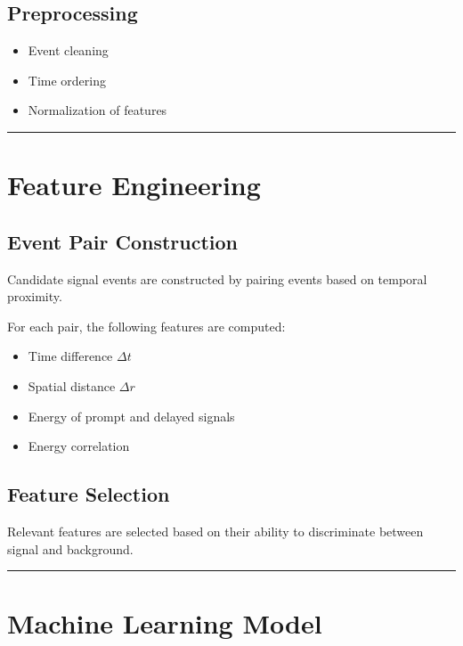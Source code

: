 \documentclass[
  authoryear,
  preprint]{elsarticle}
\providecommand{\tightlist}{%
  \setlength{\itemsep}{0pt}\setlength{\parskip}{0pt}}
\begin{document}
\subsection{Preprocessing}\label{preprocessing}

\begin{itemize}
\tightlist
\item
  Event cleaning
\item
  Time ordering
\item
  Normalization of features
\end{itemize}

\begin{center}\rule{0.5\linewidth}{0.5pt}\end{center}

\section{Feature Engineering}\label{feature-engineering}

\subsection{Event Pair Construction}\label{event-pair-construction}

Candidate signal events are constructed by pairing events based on
temporal proximity.

For each pair, the following features are computed:

\begin{itemize}
\tightlist
\item
  Time difference \(\Delta t\)
\item
  Spatial distance \(\Delta r\)
\item
  Energy of prompt and delayed signals
\item
  Energy correlation
\end{itemize}

\subsection{Feature Selection}\label{feature-selection}

Relevant features are selected based on their ability to discriminate
between signal and background.

\begin{center}\rule{0.5\linewidth}{0.5pt}\end{center}

\section{Machine Learning Model}\label{machine-learning-model}
\end{document}
